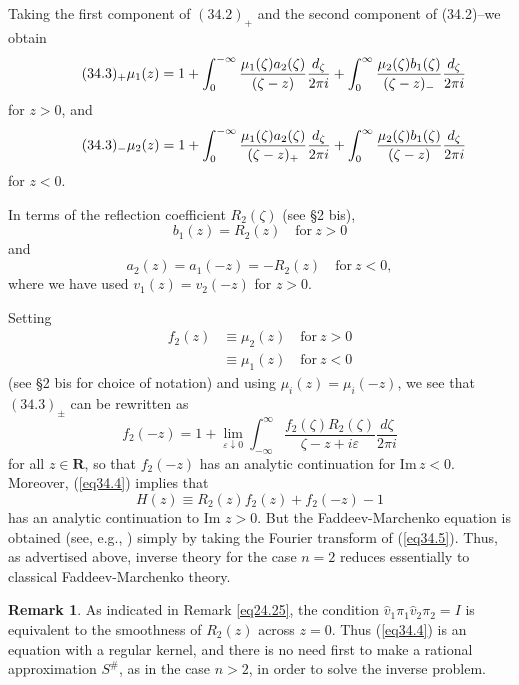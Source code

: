 \documentclass{surv-l}
\theoremstyle{plain}
\theoremstyle{definition}
\newtheorem{remark}[theorem]{Remark}
\numberwithin{equation}{chapter}
\begin{document}
Taking the first component of $(34.2)_{+}$ and the second component
of (34.2)--we obtain
\begin{equation*}
\tag*{$(34.3)_{+}$}\mu_{1}(z)=1+\int_{0}^{-\infty}\frac{\mu_{1}(\zeta)a_{2}(\zeta)}{(\zeta-z)}\frac{d_{\zeta}}{2\pi i}+\int_{0}^{\infty}\frac{\mu_{2}(\zeta)b_{1}(\zeta)}{(\zeta-z)_{-}}\frac{d_{\zeta}}{2\pi i}
\end{equation*}
for $z>0$, and
\begin{equation*}
\tag*{$(34.3)_{-}$}\mu_{2}(z)=1+\int_{0}^{-\infty}\frac{\mu_{1}(\zeta)a_{2}(\zeta)}{(\zeta-z)_{+}}\frac{d_{\zeta}}{2\pi i}+\int_{0}^{\infty}\frac{\mu_{2}(\zeta)b_{1}(\zeta)}{(\zeta-z)}\frac{d_{\zeta}}{2\pi i}
\end{equation*}
for $z<0$.

In terms of the reflection coefficient $R_{2}(\zeta)$ (see \S 2 bis),
\begin{equation*}
b_{1}(z)=R_{2}(z)\quad \mathrm{for}\ z>0
\end{equation*}
and
\begin{equation*}
a_{2}(z)=a_{1}(-z)=-R_{2}(z)\quad \mathrm{for}\ z<0,
\end{equation*}
where we have used $v_{1}(z)=v_{2}(-z)$ for $z>0$.

Setting
\begin{align*}
f_{2}(z)&\equiv\mu_{2}(z)\quad \mathrm{for}\ z>0\\
&\equiv\mu_{1}(z)\quad \mathrm{for}\ z<0
\end{align*}
(see \S 2 bis for choice of notation) and using $\mu_{i}(z)=\mu_{i}(-z)$, we see that $(34.3)_{\pm}$ can be rewritten as
\setcounter{equation}{3}
\begin{equation}\label{eq34.4}
f_{2}(-z)=1+\lim_{\varepsilon\downarrow 0}\int_{-\infty}^{\infty}\frac{f_{2}(\zeta)R_{2}(\zeta)}{\zeta-z+i\varepsilon}\frac{d\zeta}{2\pi i}
\end{equation}
for all $z\in \mathbf{R}$, so that $f_{2}(-z)$ has an analytic continuation for $\mathrm{Im}\,z<0$. Moreover, (\ref{eq34.4}) implies that
\begin{equation}\label{eq34.5}
H(z)\equiv R_{2}(z)f_{2}(z)+f_{2}(-z)-1
\end{equation}
has an analytic continuation to Im $z>0$. But the Faddeev-Marchenko equation is obtained (see, e.g., \cite{DT}) simply by taking the Fourier transform of (\ref{eq34.5}). Thus, as advertised above, inverse theory for the case $n=2$ reduces essentially to classical Faddeev-Marchenko theory.
\setcounter{theorem}{5}
\begin{remark}\label{eq34.6}
As indicated in Remark \ref{eq24.25}, the condition $\hat{v}_{1}\pi_{1}\hat{v}_{2}\pi_{2}=I$ is equivalent to the smoothness of $R_{2}(z)$ across $z=0$. Thus (\ref{eq34.4}) is an equation with a regular kernel, and there is no need first to make a rational approximation $S^{\#}$, as in the case $n>2$, in order to solve the inverse problem.
\end{remark}
\end{document}
